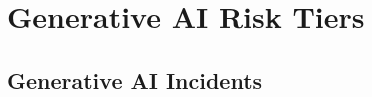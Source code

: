 \documentclass[fleqn]{article}
\begin{document}



\section{Generative AI Risk Tiers}\label{sec:tiers}






\subsection{Generative AI Incidents}\label{sec:incident}

\end{document}
